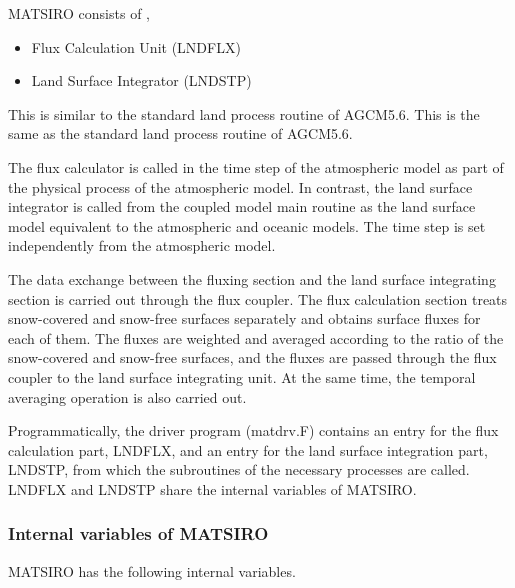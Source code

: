 MATSIRO consists of ,

\begin{itemize}
\item
  Flux Calculation Unit (LNDFLX)
\item
  Land Surface Integrator (LNDSTP)
\end{itemize}

This is similar to the standard land process routine of AGCM5.6. This is
the same as the standard land process routine of AGCM5.6.

The flux calculator is called in the time step of the atmospheric model
as part of the physical process of the atmospheric model. In contrast,
the land surface integrator is called from the coupled model main
routine as the land surface model equivalent to the atmospheric and
oceanic models. The time step is set independently from the atmospheric
model.

The data exchange between the fluxing section and the land surface
integrating section is carried out through the flux coupler. The flux
calculation section treats snow-covered and snow-free surfaces
separately and obtains surface fluxes for each of them. The fluxes are
weighted and averaged according to the ratio of the snow-covered and
snow-free surfaces, and the fluxes are passed through the flux coupler
to the land surface integrating unit. At the same time, the temporal
averaging operation is also carried out.

Programmatically, the driver program (matdrv.F) contains an entry for
the flux calculation part, LNDFLX, and an entry for the land surface
integration part, LNDSTP, from which the subroutines of the necessary
processes are called. LNDFLX and LNDSTP share the internal variables of
MATSIRO.

\hypertarget{internal-variables-of-matsiro}{%
\subsubsection{Internal variables of
MATSIRO}\label{internal-variables-of-matsiro}}

MATSIRO has the following internal variables.

